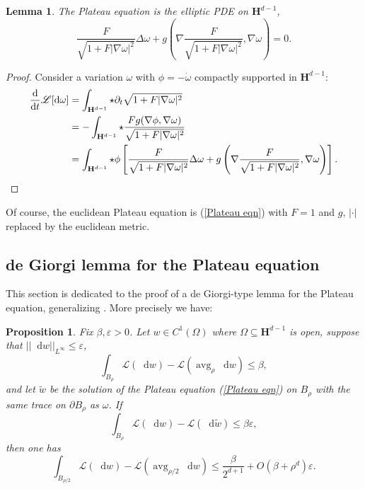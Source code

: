 \documentclass[reqno,10pt]{amsart}
\newcommand{\Hyp}{\mathbf H}
\DeclareMathOperator{\avg}{avg}
\newcommand*\dif{\mathop{}\!\mathrm{d}}
\newcommand{\Lagrange}{\mathscr L}
\newtheorem{lemma}[theorem]{Lemma}
\newtheorem{proposition}[theorem]{Proposition}
\theoremstyle{definition}
\numberwithin{equation}{section}
\begin{document}
\begin{lemma}
The Plateau equation is the elliptic PDE on $\Hyp^{d - 1}$,
\begin{equation}\label{Plateau eqn}
\frac{F}{\sqrt{1 + F |\nabla \omega|^2}} \Delta \omega + g\left(\nabla \frac{F}{\sqrt{1 + F |\nabla \omega|^2}}, \nabla \omega\right) = 0.
\end{equation}
\end{lemma}
\begin{proof}
Consider a variation $\omega$ with $\phi = -\dot \omega$ compactly supported in $\Hyp^{d - 1}$:
\begin{align*}
\frac{\dif}{\dif t} \Lagrange[\dif \omega] &= \int_{\Hyp^{d - 1}} \star \partial_t \sqrt{1 + F |\nabla \omega|^2} \\
&= -\int_{\Hyp^{d - 1}} \star \frac{F g(\nabla \phi, \nabla \omega)}{\sqrt{1 + F|\nabla \omega|^2}} \\
&= \int_{\Hyp^{d - 1}} \star \phi\left[\frac{F}{\sqrt{1 + F |\nabla \omega|^2}} \Delta \omega + g\left(\nabla \frac{F}{\sqrt{1 + F |\nabla \omega|^2}}, \nabla \omega\right)\right]. \qedhere
\end{align*}
\end{proof}

Of course, the euclidean Plateau equation is (\ref{Plateau eqn}) with $F = 1$ and $g$, $|\cdot|$ replaced by the euclidean metric.

\subsection{de Giorgi lemma for the Plateau equation}
This section is dedicated to the proof of a de Giorgi-type lemma for the Plateau equation, generalizing \cite[Teorema 4.3]{Miranda66}.
More precisely we have:

\begin{proposition}\label{dGL Laplace}
Fix $\beta, \varepsilon > 0$.
Let $w \in C^1(\Omega)$ where $\Omega \subseteq \Hyp^{d - 1}$ is open, suppose that $||\dif w||_{L^\infty} \leq \varepsilon$,
\begin{equation}\label{dGL Laplace 1}
\int_{B_\rho} \Lagrange(\dif w) - \Lagrange(\avg_\rho \dif w) \leq \beta,
\end{equation}
and let $\tilde w$ be the solution of the Plateau equation (\ref{Plateau eqn}) on $B_\rho$ with the same trace on $\partial B_\rho$ as $\omega$.
If
\begin{equation}\label{dGL Laplace 2}
\int_{B_\rho} \Lagrange(\dif w) - \Lagrange(\dif \tilde w) \leq \beta\varepsilon,
\end{equation}
then one has
\begin{equation}\label{dGL Laplace concl}
\int_{B_{\rho/2}} \Lagrange(\dif w) - \Lagrange(\avg_{\rho/2} \dif w) \leq \frac{\beta}{2^{d + 1}} + O(\beta + \rho^d)\varepsilon.
\end{equation}
\end{proposition}
\end{document}
